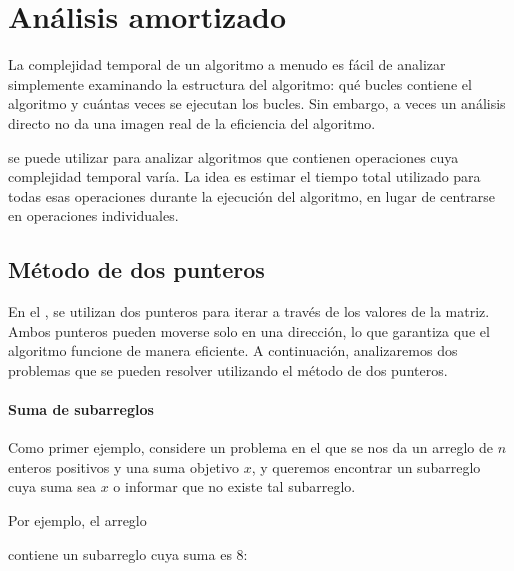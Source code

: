 \chapter{Análisis amortizado}


La complejidad temporal de un algoritmo
a menudo es fácil de analizar
simplemente examinando la estructura
del algoritmo:
qué bucles contiene el algoritmo
y cuántas veces se ejecutan los bucles.
Sin embargo, a veces un análisis directo
no da una imagen real de la eficiencia del algoritmo.

 se puede utilizar para analizar
algoritmos que contienen operaciones cuya
complejidad temporal varía.
La idea es estimar el tiempo total utilizado para
todas esas operaciones durante la
ejecución del algoritmo, en lugar de centrarse
en operaciones individuales.

\section{Método de dos punteros}


En el ,
se utilizan dos punteros para
iterar a través de los valores de la matriz.
Ambos punteros pueden moverse solo en una dirección,
lo que garantiza que el algoritmo funcione de manera eficiente.
A continuación, analizaremos dos problemas que se pueden resolver
utilizando el método de dos punteros.

\subsubsection{Suma de subarreglos}

Como primer ejemplo,
considere un problema en el que se nos
da un arreglo de $n$ enteros positivos
y una suma objetivo $x$,
y queremos encontrar un subarreglo cuya suma sea $x$
o informar que no existe tal subarreglo.

Por ejemplo, el arreglo
\begin{center}
\end{center}
contiene un subarreglo cuya suma es 8:
\begin{center}
\end{center}

